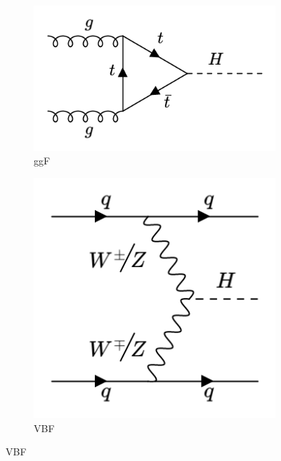 \begin{figure}[htp]
  \centering
         \begin{subfigure}[b]{0.3\textwidth}
         \centering
         \includegraphics[width=\textwidth]{figures/theory_chapter/ggF.png}
         \caption{ggF}
         \label{fig:ggF}
     \end{subfigure}
     \hfill
       \begin{subfigure}[b]{0.3\textwidth}
         \centering
         \includegraphics[width=\textwidth]{figures/theory_chapter/VBF.png}
         \caption{VBF}
         \label{fig:VBF}
     \end{subfigure}

\end{figure}

